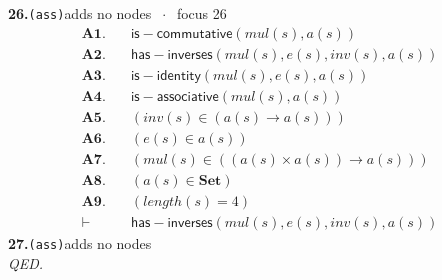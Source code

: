 \documentclass[11pt]{article}
\begin{document}
\medskip\noindent\textbf{26.}\quad \texttt{(ass)}\hfill{\small adds no nodes $\;\cdot\;$ focus 26}\\[2pt]
\begin{align*}
  \mathbf{A1.}\quad & \mathsf{is{-}commutative}(\mathit{mul}(s), a(s)) \\
  \mathbf{A2.}\quad & \mathsf{has{-}inverses}(\mathit{mul}(s), e(s), \mathit{inv}(s), a(s)) \\
  \mathbf{A3.}\quad & \mathsf{is{-}identity}(\mathit{mul}(s), e(s), a(s)) \\
  \mathbf{A4.}\quad & \mathsf{is{-}associative}(\mathit{mul}(s), a(s)) \\
  \mathbf{A5.}\quad & (\mathit{inv}(s) \in (a(s) \to a(s))) \\
  \mathbf{A6.}\quad & (e(s) \in a(s)) \\
  \mathbf{A7.}\quad & (\mathit{mul}(s) \in ((a(s) \times a(s)) \to a(s))) \\
  \mathbf{A8.}\quad & (a(s) \in \mathbf{Set}) \\
  \mathbf{A9.}\quad & (\mathit{length}(s) = 4) \\
  \vdash\quad & \mathsf{has{-}inverses}(\mathit{mul}(s), e(s), \mathit{inv}(s), a(s))
\end{align*}
\medskip\noindent\textbf{27.}\quad \texttt{(ass)}\hfill{\small adds no nodes}\\[2pt]
\emph{QED.}\par
\end{document}
